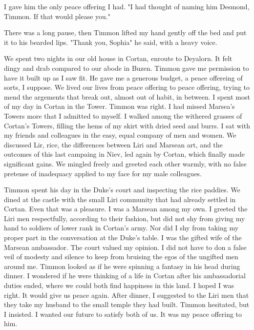 \documentclass{article}
\begin{document}
I gave him the only peace offering I had. "I had thought of naming him Desmond, Timmon. If that would please you."

There was a long pause, then Timmon lifted my hand gently off the bed and put it to his bearded lips. "Thank you, Sophia" he said, with a heavy voice.

\vspace{.5cm} 

We spent two nights in our old house in Cortan, enroute to Deyalorn. It felt dingy and drab compared to our abode in Buzen. Timmon gave me permission to have it built up as I saw fit. He gave me a generous budget, a peace offereing of sorts, I suppose. We lived our lives from peace offering to peace offering, trying to mend the argements that break out, almost out of habit, in between. I spent most of my day in Cortan in the Tower. Timmon was right. I had missed Marsea's Towers more that I admitted to myself. I walked among the withered grasses of Cortan's Towers, filling the hems of my skirt with dried seed and burrs. I sat with my friends and colleagues in the easy, equal company of men and women. We discussed Lir, rice, the differences between Liri and Marsean art, and the outcomes of this last campaing in Niev, led again by Cortan, which finally made significant gains. We mingled freely and greeted each other warmly, with no false pretense of inadequacy applied to my face for my male colleagues. 

Timmon spent his day in the Duke's court and inspecting the rice paddies. We dined at the castle with the small Liri community that had already settled in Cortan. Even that was a pleasure. I was a Marsean among my own. I greeted the Liri men respectfully, according to their fashion, but did not shy from giving my hand to soldiers of lower rank in Cortan's army. Nor did I shy from taking my proper part in the conversation at the Duke's table. I was the gifted wife of the Marsean ambassador. The court valued my opinion. I did not have to don a false veil of modesty and silence to keep from bruising the egos of the ungifted men around me. Timmon looked as if he were spinning a fantasy in his head during dinner. I wondered if he were thinking of a life in Cortan after his ambassadorial duties ended, where we could both find happiness in this land. I hoped I was right. It would give us peace again. After dinner, I suggested to the Liri men that they take my husband to the small temple they had built. Timmon hesitated, but I insisted. I wanted our future to satisfy both of us. It was my peace offering to him.
\end{document}
